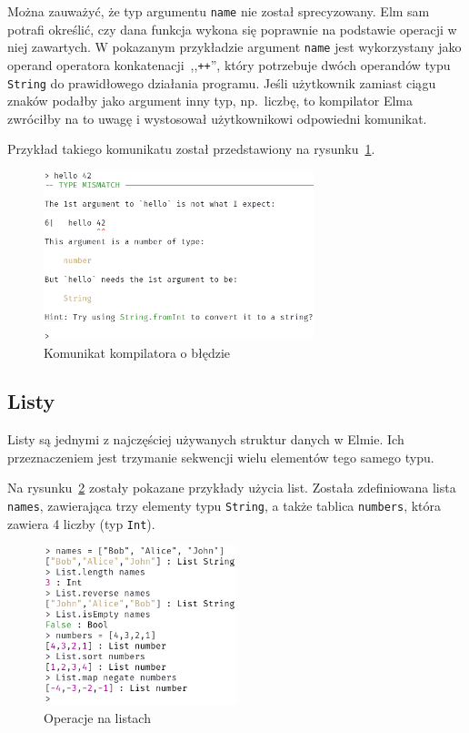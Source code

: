 \documentclass[twoside,a4paper]{report}
\begin{document}
Można zauważyć, że typ argumentu \texttt{name} nie został sprecyzowany.
Elm sam potrafi określić, czy dana funkcja wykona się poprawnie na podstawie operacji w niej zawartych.
W pokazanym przykładzie argument \texttt{name} jest wykorzystany jako operand operatora konkatenacji~,,\texttt{++}'', który potrzebuje dwóch operandów typu \texttt{String} do prawidłowego działania programu.
Jeśli użytkownik zamiast ciągu znaków podałby jako argument inny typ, np.~liczbę, to kompilator Elma zwróciłby na to uwagę i wystosował użytkownikowi odpowiedni komunikat.

Przykład takiego komunikatu został przedstawiony na rysunku~\ref{fig:repl_error}.

\begin{figure}[H]
    \centering
    \includegraphics[width=0.7\textwidth]{img/repl_error}
    \caption{Komunikat kompilatora o błędzie}\label{fig:repl_error}
\end{figure}

\subsection{Listy}
Listy są jednymi z najczęściej używanych struktur danych w Elmie.
Ich przeznaczeniem jest trzymanie sekwencji wielu elementów tego samego typu.

Na rysunku~\ref{fig:repl_lists} zostały pokazane przykłady użycia list. Została zdefiniowana lista \texttt{names}, zawierająca trzy elementy typu \texttt{String}, a także tablica \texttt{numbers}, która zawiera 4 liczby (typ \texttt{Int}).

\begin{figure}[H]
    \centering
    \includegraphics[width=0.5\textwidth]{img/repl_lists}
    \caption{Operacje na listach}\label{fig:repl_lists}
\end{figure}
\end{document}
